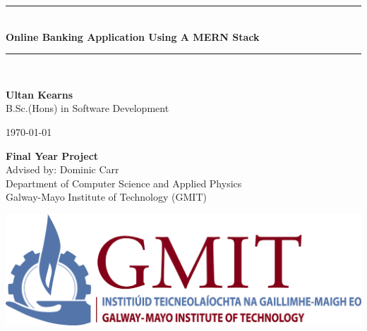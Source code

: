 \documentclass[12pt,a4paper,oneside,openany]{book}
\newcommand{\projecttitle}{Online Banking Application Using A MERN Stack}
\newcommand{\projectauthor}{Ultan Kearns}
\newcommand{\projectadvisor}{Dominic Carr}
\newcommand{\projectprogramme}{B.Sc.(Hons) in Software Development}
\newcommand{\projectdate}{\today}
\begin{document}
  \begin{titlepage}
    \begin{minipage}[t][6cm]{\textwidth}
      \centering
      \rule{\linewidth}{0.5mm} \\[0.4cm]
      { \LARGE \bfseries \projecttitle \\[0.4cm] }
      \rule{\linewidth}{0.5mm} \\[0.8cm]
    \end{minipage}

    \begin{minipage}[t][6.5cm]{\textwidth}
      \centering
      \textbf{\projectauthor}\\[0.5cm]
      \projectprogramme
    \end{minipage}

    \begin{minipage}[t][1cm]{\textwidth}
      \centering
      \textsc{\projectdate}
    \end{minipage}

    \begin{minipage}[t][3cm]{\textwidth}
      \centering
      \textbf{Final Year Project}\\[0.3cm]
      Advised by: \projectadvisor \\[0.1cm]
      Department of Computer Science and Applied Physics\\
      Galway-Mayo Institute of Technology (GMIT)
    \end{minipage}

    \begin{center}
      \includegraphics{img/gmit-logo.jpg}
    \end{center}
  \end{titlepage}
  \setcounter{page}{2}
  \tableofcontents
  
  
  
\end{document}
